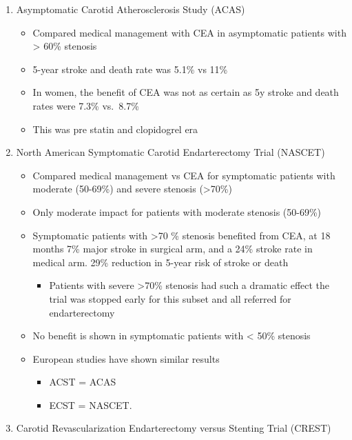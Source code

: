 \documentclass[
]{book}
\providecommand{\tightlist}{%
  \setlength{\itemsep}{0pt}\setlength{\parskip}{0pt}}
\begin{document}
\begin{enumerate}
\def\labelenumi{\arabic{enumi}.}
\item
  Asymptomatic Carotid Atherosclerosis Study (ACAS)

  \begin{itemize}
  \item
    Compared medical management with CEA in asymptomatic patients
    with \textgreater{} 60\% stenosis
  \item
    5-year stroke and death rate was 5.1\% vs 11\%
  \item
    In women, the benefit of CEA was not as certain as 5y stroke and
    death rates were 7.3\% vs.~8.7\%
  \item
    This was pre statin and clopidogrel era
  \end{itemize}
\item
  North American Symptomatic Carotid Endarterectomy Trial (NASCET)
  \citep{northamericansymptomaticcarotidendarterectomytrialcollaboratorsBeneficialEffectCarotid1991}

  \begin{itemize}
  \item
    Compared medical management vs CEA for symptomatic patients with
    moderate (50-69\%) and severe stenosis (\textgreater70\%)
  \item
    Only moderate impact for patients with moderate stenosis
    (50-69\%)
  \item
    Symptomatic patients with \textgreater70 \% stenosis benefited from CEA, at
    18 months 7\% major stroke in surgical arm, and a 24\% stroke rate
    in medical arm. 29\% reduction in 5-year risk of stroke or death

    \begin{itemize}
    \tightlist
    \item
      Patients with severe \textgreater70\% stenosis had such a dramatic
      effect the trial was stopped early for this subset and all
      referred for endarterectomy
    \end{itemize}
  \item
    No benefit is shown in symptomatic patients with \textless{} 50\% stenosis
  \item
    European studies have shown similar results

    \begin{itemize}
    \item
      ACST = ACAS
    \item
      ECST = NASCET.
    \end{itemize}
  \end{itemize}
\item
  Carotid Revascularization Endarterectomy versus Stenting Trial
  (CREST)


\end{enumerate}
\end{document}
